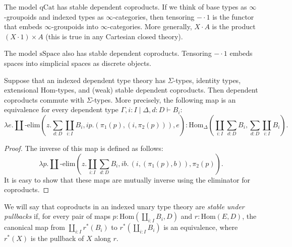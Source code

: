 \documentclass[reqno]{mscs}
\newcommand{\ob}{}
\newcommand{\fs}[1]{\mathrm{#1}}
\newcommand{\Hom}{\fs{Hom}}
\newcommand{\qCat}{\fs{qCat}}
\newcommand{\sSpace}{\fs{sSpace}}
\numberwithin{figure}{section}
\begin{document}
\begin{example}
The model $\qCat$ has stable dependent coproducts.
If we think of base types as $\infty$-groupoids and indexed types as $\infty$-categories, then tensoring $- \cdot 1$ is the functor that embeds $\infty$-groupoids into $\infty$-categories.
More generally, $X \cdot A$ is the product $(X \cdot 1) \times A$ (this is true in any Cartesian closed theory).
\end{example}

\begin{example}
The model $\sSpace$ also has stable dependent coproducts.
Tensoring $- \cdot 1$ embeds spaces into simplicial spaces as discrete objects.
\end{example}

\begin{prop}
Suppose that an indexed dependent type theory has $\Sigma$-types, identity types, extensional $\Hom$-types, and (weak) stable dependent coproducts.
Then dependent coproducts commute with $\Sigma$-types.
More precisely, the following map is an equivalence for every dependent type $\Gamma, i : I \mid \Delta, d : D \vdash B_i \ob$:
\[ \lambda e. \coprod\text{-}\fs{elim}(z. \sum_{d : D} \coprod_{i : I} B_i, i p. (\pi_1(p),(i,\pi_2(p))), e) : \Hom_\Delta(\coprod_{i : I} \sum_{d : D} B_i, \sum_{d : D} \coprod_{i : I} B_i). \]
\end{prop}
\begin{proof}
The inverse of this map is defined as follows:
\[ \lambda p. \coprod\text{-}\fs{elim}(z. \coprod_{i : I} \sum_{d : D} B_i, i b.\,(i,(\pi_1(p),b)), \pi_2(p)). \]
It is easy to show that these maps are mutually inverse using the eliminator for coproducts.
\end{proof}

We will say that coproducts in an indexed unary type theory are \emph{stable under pullbacks} if, for every pair of maps $p : \Hom(\coprod_{i : I} B_i, D)$ and $r : \Hom(E,D)$,
the canonical map from $\coprod_{i : I} r^*(B_i)$ to $r^*(\coprod_{i : I} B_i)$ is an equivalence, where $r^*(X)$ is the pullback of $X$ along $r$.
\end{document}
